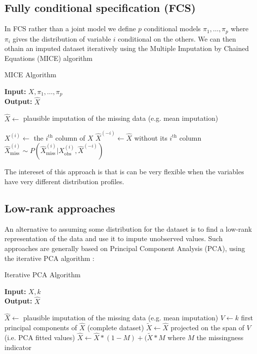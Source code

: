 		\subsection{Fully conditional specification (FCS)}
In FCS rather than a joint model we define $p$ conditional models $\pi_1, \ldots, \pi_p$ where $\pi_i$ gives the distribution of variable $i$ conditional on the others. We can then othain an imputed dataset iteratively using the Multiple Imputation by Chained Equations (MICE) algorithm \cite{MICE_founding}
\begin{algorithm}[H]
	\caption{MICE Algorithm}
	\hspace*{\algorithmicindent} \textbf{Input:} $X, \pi_1, \ldots, \pi_p$  \\
 	\hspace*{\algorithmicindent} \textbf{Output:} $\hat{X}$
	\begin{algorithmic}[1]
		\State $\hat{X} \leftarrow $ plausible imputation of the missing data (e.g. mean imputation)

				\State $X^{(i)} \leftarrow $ the $i^{\text{th}}$ column of $X$
				\State $\hat{X}^{(-i)} \leftarrow \hat{X}$  without its $i^{\text{th}}$ column
				\State $\hat{X}^{(i)}_{\text{miss}} \sim P(\hat{X}^{(i)}_{\text{miss}} \vert {X}^{(i)}_{\text{obs}}, \hat{X}^{(-i)})$
			\EndFor
		\EndWhile
	\end{algorithmic}
\end{algorithm}

The intereset of this approach is that is can be very flexible when the variables have very different distribution profiles. 
		\subsection{Low-rank approaches}
An alternative to assuming some distribution for the dataset is to find a low-rank representation of the data and use it to impute unobserved values. Such approaches \cite{josse2012missPCA}\cite{chen2004missSVD}\cite{brand2002incremental} are generally based on Principal Component Analysis (PCA)\cite{PCA}, using the iterative PCA algorithm \cite{iter_PCA}:		
		\begin{algorithm}[H]
	\caption{Iterative PCA Algorithm}
	\hspace*{\algorithmicindent} \textbf{Input:} $X, k$  \\
 	\hspace*{\algorithmicindent} \textbf{Output:} $\hat{X}$
	\begin{algorithmic}[1]
		\State $\hat{X} \leftarrow $ plausible imputation of the missing data (e.g. mean imputation)
			\State $V \leftarrow k$ first principal components of $\hat{X}$ (complete dataset)
			\State $\tilde{X} \leftarrow \hat{X}$ projected on the span of $V$ (i.e. PCA fitted values)
			\State $\hat{X} \leftarrow \hat{X} * (1-M) + (\tilde{X} * M$ where $M$ the missingness indicator
		\EndWhile
	\end{algorithmic}
\end{algorithm}		

